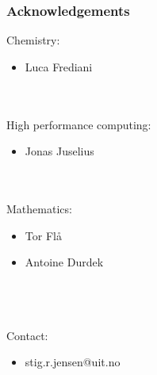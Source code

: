 \documentclass[slides]{beamer}
\begin{document}
\begin{frame}
    \frametitle{Acknowledgements}
    Chemistry:
    \begin{itemize}
	\item Luca Frediani
    \end{itemize}
    \ \\
    \ \\
    High performance computing:
    \begin{itemize}
    	\item Jonas Juselius
    \end{itemize}
    \ \\
    \ \\
    Mathematics:
    \begin{itemize}
	\item Tor Fl\aa
	\item Antoine Durdek
    \end{itemize}
    \ \\
    \ \\
    \ \\
    Contact:
    \begin{itemize}
	\item stig.r.jensen@uit.no
    \end{itemize}
\end{frame}
\end{document}
